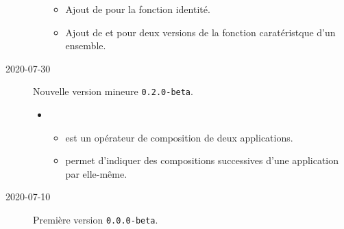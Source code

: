\documentclass[12pt,a4paper]{article}
\begin{document}
\begin{description}
\begin{itemize}[itemsep=.5em]
        \begin{itemize}[itemsep=.5em]
            \item Ajout de  pour la fonction identité.
    
            \item Ajout de  et  pour deux versions de la fonction caratéristque d'un ensemble.
        \end{itemize}
    \end{itemize}
    
    \separation

    \medskip
    \item[2020-07-30] Nouvelle version mineure \verb+0.2.0-beta+.
    
    \begin{itemize}[itemsep=.5em]
        \item {}
        \begin{itemize}[itemsep=.5em]
            \item {} est un opérateur de composition de deux applications.
    
            \item {} permet d'indiquer des compositions successives d'une application par elle-même.
        \end{itemize}
    \end{itemize}
    
    \separation


    \medskip
    \item[2020-07-10] Première version \verb+0.0.0-beta+.

\end{description}
\end{document}
